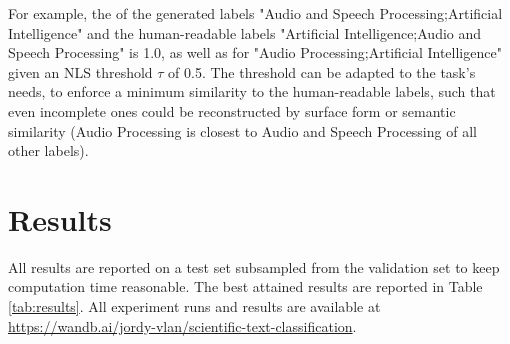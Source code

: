 \documentclass[11pt,letterpaper]{article}
\begin{document}
For example, the \ANLS{} of the generated labels "Audio and Speech Processing;Artificial Intelligence" and the human-readable labels "Artificial Intelligence;Audio and Speech Processing" is 1.0, as well as for "Audio Processing;Artificial Intelligence" given an NLS threshold $\tau$ of 0.5. The threshold can be adapted to the task's needs, \eg to enforce a minimum similarity to the human-readable labels, such that even incomplete ones could be reconstructed by surface form or semantic similarity (\eg Audio Processing is closest to Audio and Speech Processing of all other labels).

\section{Results}

All results are reported on a test set subsampled from the validation set to keep computation time reasonable. The best attained results are reported in Table \ref{tab:results}.
All experiment runs and results are available at \url{https://wandb.ai/jordy-vlan/scientific-text-classification}.
\end{document}
